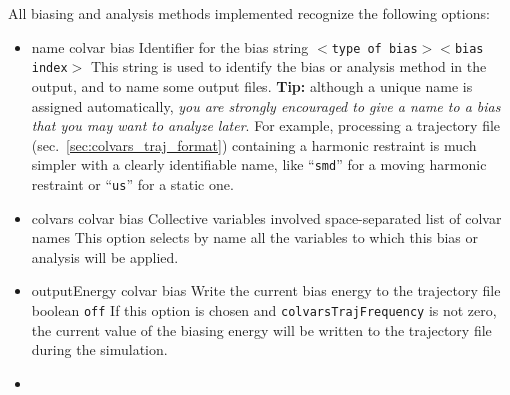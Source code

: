 All biasing and analysis methods implemented recognize the following options:
\begin{itemize}

\item %
  \keydef
    {name}{%
    colvar bias}{%
    Identifier for the bias}{%
    string}{%
    \texttt{$<$type of bias$><$bias index$>$}}{%
    This string is used to identify the bias or analysis method in the output, and to name some output files.
    \textbf{Tip:} although a unique name is assigned automatically, \emph{you are strongly encouraged to give a name to a bias that you may want to analyze later}.  For example, processing a trajectory file (sec.~\ref{sec:colvars_traj_format}) containing a harmonic restraint is much simpler with a clearly identifiable name, like ``\texttt{smd}'' for a moving harmonic restraint or ``\texttt{us}'' for a static one.
  }

\item %
  \key
    {colvars}{%
    colvar bias}{%
    Collective variables involved}{%
    space-separated list of colvar names}{%
    This option selects by name all the variables to which this bias or analysis will be applied.}

\item %
  \keydef
    {outputEnergy}{%
    colvar bias}{%
    Write the current bias energy to the trajectory file}{%
    boolean}{%
    \texttt{off}}{%
    If this option is chosen and \texttt{colvarsTrajFrequency} is not zero, the current value of the biasing energy will be written to the trajectory file during the simulation.
}

\item %


\end{itemize}
